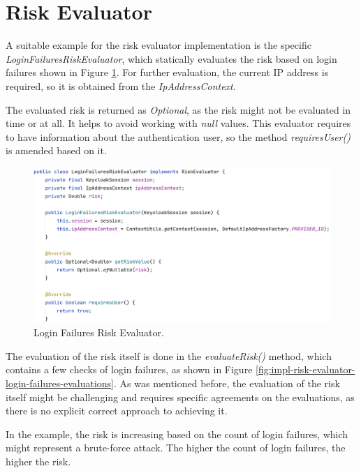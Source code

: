 \newpage
\section{Risk Evaluator}
A suitable example for the risk evaluator implementation is the specific \textit{LoginFailuresRiskEvaluator}, which statically evaluates the risk based on login failures shown in Figure \ref{fig:impl-risk-evaluator-login-failures}.
For further evaluation, the current IP address is required, so it is obtained from the \textit{IpAddressContext}.

The evaluated risk is returned as \textit{Optional}, as the risk might not be evaluated in time or at all. 
It helps to avoid working with \textit{null} values.
This evaluator requires to have information about the authentication user, so the method \textit{requiresUser()} is amended based on it.

\begin{figure}[htbp]
  \centering
  \includegraphics[width=1\textwidth]{img/sections/6-implementation/loginFailures.png}
  \caption{Login Failures Risk Evaluator.}
  \label{fig:impl-risk-evaluator-login-failures}
\end{figure}

The evaluation of the risk itself is done in the \textit{evaluateRisk()} method, which contains a few checks of login failures, as shown in Figure \ref{fig:impl-risk-evaluator-login-failures-evaluations}.
As was mentioned before, the evaluation of the risk itself might be challenging and requires specific agreements on the evaluations, as there is no explicit correct approach to achieving it.

In the example, the risk is increasing based on the count of login failures, which might represent a brute-force attack.
The higher the count of login failures, the higher the risk.

